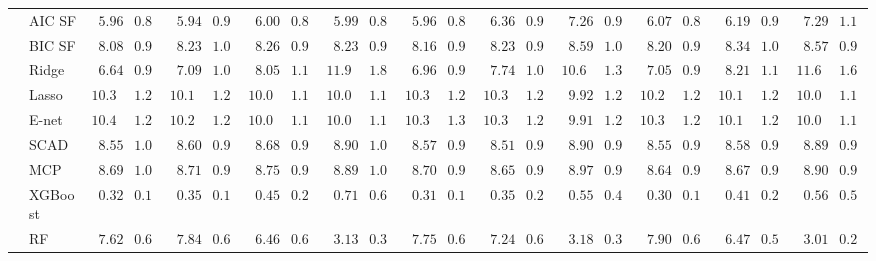 \begin{tabular}{p{0.2cm}p{1cm}|p{0.6cm}p{0.6cm}|p{0.6cm}p{0.6cm}p{0.6cm}p{0.6cm}p{0.6cm}p{0.6cm}|p{0.6cm}p{0.6cm}p{0.6cm}p{0.6cm}p{0.6cm}p{0.6cm}|p{0.6cm}p{0.6cm}p{0.6cm}p{0.6cm}p{0.6cm}p{0.6cm}}
 & AIC SF  & $\phantom{0}5.96$ & $0.86$ & $\phantom{0}5.94$ & $0.91$ & $\phantom{0}6.00$ & $0.87$ & $\phantom{0}5.99$ & $0.84$ & $\phantom{0}5.96$ & $0.86$ & $\phantom{0}6.36$ & $0.93$ & $\phantom{0}7.26$ & $0.97$ & $\phantom{0}6.07$ & $0.87$ & $\phantom{0}6.19$ & $0.96$ & $\phantom{0}7.29$ & $1.15$ \\
 & BIC SF  & $\phantom{0}8.08$ & $0.99$ & $\phantom{0}8.23$ & $1.03$ & $\phantom{0}8.26$ & $0.94$ & $\phantom{0}8.23$ & $0.96$ & $\phantom{0}8.16$ & $0.95$ & $\phantom{0}8.23$ & $0.99$ & $\phantom{0}8.59$ & $1.01$ & $\phantom{0}8.20$ & $0.91$ & $\phantom{0}8.34$ & $1.00$ & $\phantom{0}8.57$ & $0.93$ \\
 & Ridge  & $\phantom{0}6.64$ & $0.97$ & $\phantom{0}7.09$ & $1.06$ & $\phantom{0}8.05$ & $1.15$ & $11.95$ & $1.80$ & $\phantom{0}6.96$ & $0.99$ & $\phantom{0}7.74$ & $1.02$ & $10.66$ & $1.36$ & $\phantom{0}7.05$ & $0.93$ & $\phantom{0}8.21$ & $1.10$ & $11.67$ & $1.66$ \\
 & Lasso  & $10.30$ & $1.25$ & $10.18$ & $1.21$ & $10.06$ & $1.18$ & $10.05$ & $1.16$ & $10.30$ & $1.26$ & $10.33$ & $1.26$ & $\phantom{0}9.92$ & $1.21$ & $10.25$ & $1.20$ & $10.13$ & $1.20$ & $10.00$ & $1.15$ \\
 & E-net  & $10.40$ & $1.29$ & $10.22$ & $1.21$ & $10.06$ & $1.19$ & $10.06$ & $1.13$ & $10.35$ & $1.32$ & $10.37$ & $1.29$ & $\phantom{0}9.91$ & $1.20$ & $10.32$ & $1.25$ & $10.13$ & $1.21$ & $10.04$ & $1.19$ \\
 & SCAD  & $\phantom{0}8.55$ & $1.04$ & $\phantom{0}8.60$ & $0.98$ & $\phantom{0}8.68$ & $0.91$ & $\phantom{0}8.90$ & $1.03$ & $\phantom{0}8.57$ & $0.98$ & $\phantom{0}8.51$ & $0.96$ & $\phantom{0}8.90$ & $0.95$ & $\phantom{0}8.55$ & $0.93$ & $\phantom{0}8.58$ & $0.93$ & $\phantom{0}8.89$ & $0.96$ \\
 & MCP  & $\phantom{0}8.69$ & $1.01$ & $\phantom{0}8.71$ & $0.97$ & $\phantom{0}8.75$ & $0.94$ & $\phantom{0}8.89$ & $1.02$ & $\phantom{0}8.70$ & $0.97$ & $\phantom{0}8.65$ & $0.99$ & $\phantom{0}8.97$ & $0.97$ & $\phantom{0}8.64$ & $0.93$ & $\phantom{0}8.67$ & $0.94$ & $\phantom{0}8.90$ & $0.97$ \\
 & XGBoost  & $\phantom{0}0.32$ & $0.13$ & $\phantom{0}0.35$ & $0.15$ & $\phantom{0}0.45$ & $0.26$ & $\phantom{0}0.71$ & $0.69$ & $\phantom{0}0.31$ & $0.15$ & $\phantom{0}0.35$ & $0.20$ & $\phantom{0}0.55$ & $0.42$ & $\phantom{0}0.30$ & $0.18$ & $\phantom{0}0.41$ & $0.22$ & $\phantom{0}0.56$ & $0.57$ \\
 & RF  & $\phantom{0}7.62$ & $0.63$ & $\phantom{0}7.84$ & $0.61$ & $\phantom{0}6.46$ & $0.60$ & $\phantom{0}3.13$ & $0.35$ & $\phantom{0}7.75$ & $0.62$ & $\phantom{0}7.24$ & $0.61$ & $\phantom{0}3.18$ & $0.39$ & $\phantom{0}7.90$ & $0.66$ & $\phantom{0}6.47$ & $0.53$ & $\phantom{0}3.01$ & $0.28$ \\

\end{tabular}
